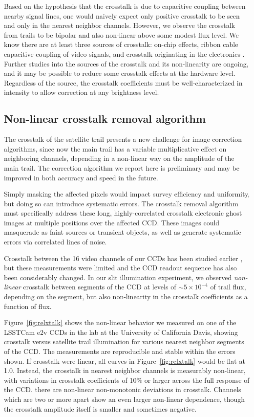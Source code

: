 \documentclass[twocolumn,trackchanges]{aastex63}
\begin{document}
Based on the hypothesis that the crosstalk is due to capacitive coupling between nearby signal lines, one would naively expect only positive crosstalk to be seen and only in the nearest neighbor channels. However, we observe the crosstalk from trails to be bipolar and also non-linear above some modest flux level. We know there are at least three sources of crosstalk: on-chip effects, ribbon cable capacitive coupling of video signals, and crosstalk originating in the electronics \citep{Antilogus_2017}. Further studies into the sources of the crosstalk and its non-linearity are ongoing, and it may be possible to reduce some crosstalk effects at the hardware level. Regardless of the source, the crosstalk coefficients must be well-characterized in intensity to allow correction at any brightness level.


\subsection{Non-linear crosstalk removal algorithm}
\label{subsec:crosstalk}
The crosstalk of the satellite trail presents a new challenge for image correction algorithms, since now the main trail has a variable multiplicative effect on neighboring channels, depending in a non-linear way on the amplitude of the main trail. The correction algorithm we report here is preliminary and may be improved in both accuracy and speed in the future.

Simply masking the affected pixels would impact survey efficiency and uniformity, but doing so can introduce systematic errors. The crosstalk removal algorithm must specifically address these long, highly-correlated crosstalk electronic ghost images at multiple positions over the affected CCD. These images could masquerade as faint sources or transient objects, as well as generate systematic errors via correlated lines of noise.

Crosstalk between the 16 video channels of our CCDs has been studied earlier \citep{O_Connor_2015}, but these measurements were limited and the CCD readout sequence has also been considerably changed. In our slit illumination experiment, we observed {\it non-linear} crosstalk between segments of the CCD at levels of $\sim5 \times 10^{-4}$ of trail flux, depending on the segment, but also non-linearity in the crosstalk coefficients as a function of flux.

Figure~\ref{fig:relxtalk} shows the non-linear behavior we  measured on one of the LSSTCam e2v CCDs in the lab at the University of California Davis, showing crosstalk versus satellite trail illumination for various nearest neighbor segments of the CCD. The measurements are reproducible and stable within the errors shown. If crosstalk were linear, all curves in Figure~\ref{fig:relxtalk} would be flat at 1.0. Instead, the crosstalk in nearest neighbor channels is measurably non-linear, with variations in crosstalk coefficients of 10\% or larger across the full response of the CCD.
there are non-linear non-monotonic deviations in crosstalk.   Channels which are two or more apart show an even larger non-linear dependence, though the crosstalk amplitude itself is smaller and sometimes negative.
\end{document}
